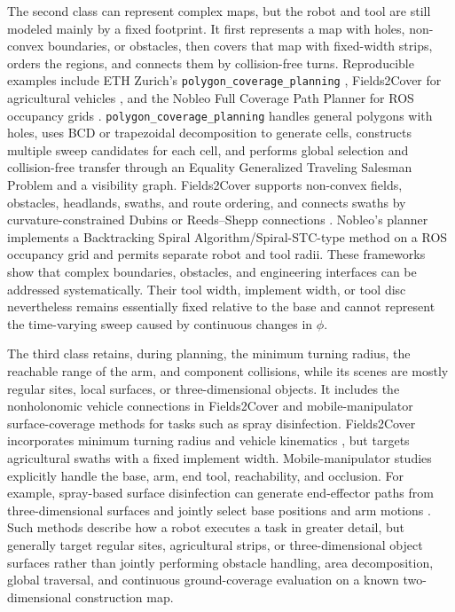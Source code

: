 The second class can represent complex maps, but the robot and tool are still modeled mainly by a fixed footprint. It first represents a map with holes, non-convex boundaries, or obstacles, then covers that map with fixed-width strips, orders the regions, and connects them by collision-free turns. Reproducible examples include ETH Zurich's \texttt{polygon\_coverage\_planning} \cite{bahnemann2021,polygoncoverage}, Fields2Cover for agricultural vehicles \cite{mier2023,fields2cover}, and the Nobleo Full Coverage Path Planner for ROS occupancy grids \cite{nobleo}. \texttt{polygon\_coverage\_planning} handles general polygons with holes, uses BCD or trapezoidal decomposition to generate cells, constructs multiple sweep candidates for each cell, and performs global selection and collision-free transfer through an Equality Generalized Traveling Salesman Problem and a visibility graph. Fields2Cover supports non-convex fields, obstacles, headlands, swaths, and route ordering, and connects swaths by curvature-constrained Dubins or Reeds--Shepp connections \cite{mier2023,fields2cover}. Nobleo's planner implements a Backtracking Spiral Algorithm/Spiral-STC-type method \cite{nobleo} on a ROS occupancy grid and permits separate robot and tool radii. These frameworks show that complex boundaries, obstacles, and engineering interfaces can be addressed systematically. Their tool width, implement width, or tool disc nevertheless remains essentially fixed relative to the base and cannot represent the time-varying sweep caused by continuous changes in $\phi$.

The third class retains, during planning, the minimum turning radius, the reachable range of the arm, and component collisions, while its scenes are mostly regular sites, local surfaces, or three-dimensional objects. It includes the nonholonomic vehicle connections in Fields2Cover and mobile-manipulator surface-coverage methods for tasks such as spray disinfection. Fields2Cover incorporates minimum turning radius and vehicle kinematics \cite{mier2023,fields2cover}, but targets agricultural swaths with a fixed implement width. Mobile-manipulator studies explicitly handle the base, arm, end tool, reachability, and occlusion. For example, spray-based surface disinfection can generate end-effector paths from three-dimensional surfaces and jointly select base positions and arm motions \cite{thakar2022}. Such methods describe how a robot executes a task in greater detail, but generally target regular sites, agricultural strips, or three-dimensional object surfaces rather than jointly performing obstacle handling, area decomposition, global traversal, and continuous ground-coverage evaluation on a known two-dimensional construction map.

